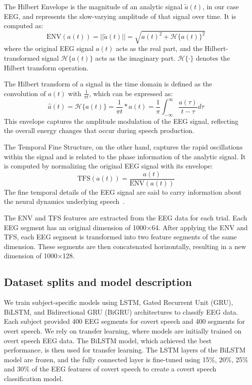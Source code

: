 \documentclass[onecolumn]{IEEEtran}
\begin{document}
The Hilbert Envelope is the magnitude of an analytic signal $\tilde{a}(t)$, 
in our case EEG, and represents the slow-varying amplitude of that signal over time.
It is computed as:
\begin{equation}
    \text{ENV}(a(t)) = ||\tilde{a}(t)|| = \sqrt{a(t)^2 + \mathcal{H}\{a(t)\}^2}
\end{equation}
where the original EEG signal $a(t)$ acts as the real part, and the Hilbert-transformed signal $\mathcal{H}\{a(t)\}$ acts as the imaginary part. $\mathcal{H}\{\cdot\}$ denotes the Hilbert transform operation.

The Hilbert transform of a signal in the time domain is defined as the convolution of $a(t)$ with $\frac{1}{\pi t}$, which can be expressed as:
\begin{equation}
    \hat{a}(t) = \mathcal{H}\{a(t)\} = \frac{1}{\pi t} \ast a(t) = \frac{1}{\pi} \int_{-\infty}^{\infty} \frac{a(\tau)}{t - \tau} d\tau
\end{equation}
This envelope captures the amplitude modulation of the EEG signal, 
reflecting the overall energy changes that occur during speech production.

The Temporal Fine Structure, on the other hand, 
captures the rapid oscillations within the signal and is related to the phase information of the analytic signal. 
It is computed by normalizing the original EEG signal with its envelope:
\begin{equation}
    \text{TFS}(a(t)) = \frac{{a}(t)}{\text{ENV}(a(t))}
\end{equation}
The fine temporal details of the EEG signal are said to carry information about the neural dynamics underlying speech~\cite{moon2014temporal,ni2023eeg}.

The ENV and TFS features are extracted from the EEG data for each trial. 
Each EEG segment has an original dimension of 1000$\times$64.
After applying the ENV and TFS, each EEG segment is transformed into two feature segments of the same dimension. 
These segments are then concatenated horizontally, resulting in a new dimension of 1000$\times$128. 

\subsection{Dataset splits and model description}

We train subject-specific models using LSTM, Gated Recurrent Unit (GRU), BiLSTM, and Bidirectional GRU (BiGRU) architectures to classify EEG data. 
Each subject provided 400 EEG segments for covert speech and 400 segments for overt speech. 
We rely on transfer learning, where models are initially trained on overt speech EEG data. 
The BiLSTM model, which achieved the best performance, is then used for transfer learning. 
The LSTM layers of the BiLSTM model are frozen, 
and the fully connected layer is fine-tuned using 15\%, 20\%, 25\% and 30\% of the EEG features of covert speech
to create a covert speech classification model.
\end{document}
